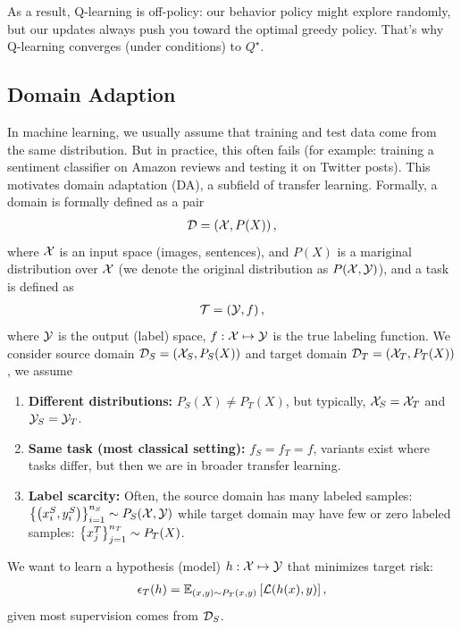 \documentclass[11pt]{article}  %
\begin{document}
As a result, Q-learning is off-policy: our behavior policy might explore randomly, but our updates always push you toward the optimal greedy policy. 
That's why Q-learning converges (under conditions) to $Q^\star$.


\subsection{Domain Adaption}
In machine learning, we usually assume that training and test data come from the same distribution.
But in practice, this often fails (for example: training a sentiment classifier on Amazon reviews and testing it on Twitter posts).
This motivates domain adaptation (DA), a subfield of transfer learning.
Formally, a domain is formally defined as a pair 
\begin{align*}
  \mathcal{D} = \left( \mathcal{X}, P(X) \right),
\end{align*}
where $\mathcal{X}$ is an input space (images, sentences), and $P(X)$ is a mariginal distribution over $\mathcal{X}$ (we denote the original distribution as $P(\mathcal{X}, \mathcal{Y})$), and a task is defined as 
\begin{align*}
  \mathcal{T} = \left( \mathcal{Y}, f \right),
\end{align*}
where $\mathcal{Y}$ is the output (label) space, $f: \mathcal{X} \mapsto \mathcal{Y}$ is the true labeling function.
We consider source domain $\mathcal{D}_{S} = \left( \mathcal{X}_{S}, P_S(X) \right)$ and target domain $\mathcal{D}_{T} = \left( \mathcal{X}_{T}, P_T(X) \right)$, we assume 
\begin{enumerate}
  \item \textbf{Different distributions:} $P_{S}(X) \neq P_{T}(X)$, but typically, $\mathcal{X}_S = \mathcal{X}_T$ and $\mathcal{Y}_S = \mathcal{Y}_T$.
  \item \textbf{Same task (most classical setting):} $f_S = f_T = f$, variants exist where tasks differ, but then we are in broader transfer learning.
  \item \textbf{Label scarcity:} Often, the source domain has many labeled samples: $\left\{ \left( x_i^S, y_i^S \right) \right\}_{i=1}^{n_S} \sim P_S(\mathcal{X}, \mathcal{Y})$ while target domain may have few or zero labeled samples: $\left\{ x_j^T \right\}_{j=1}^{n_T} \sim P_T(X)$.
\end{enumerate}
We want to learn a hypothesis (model) $h: \mathcal{X} \mapsto \mathcal{Y}$ that minimizes target risk: 
\begin{align*}
  \epsilon_T(h) = \mathbb{E}_{(x, y)\sim P_T(x, y)}\left[\mathcal{L}(h(x), y)\right],
\end{align*}
given most supervision comes from $\mathcal{D}_S$.
\end{document}
